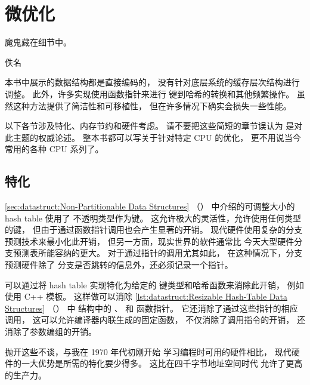 
\section{微优化}
\label{sec:together:Micro-Optimization}
%
\epigraph{魔鬼藏在细节中。}{佚名}

本书中展示的数据结构都是直接编码的，
没有针对底层系统的缓存层次结构进行调整。
此外，许多实现使用函数指针来进行
键到哈希的转换和其他频繁操作。
虽然这种方法提供了简洁性和可移植性，
但在许多情况下确实会损失一些性能。

以下各节涉及特化、内存节约和硬件考虑。
请不要把这些简短的章节误认为
是对此主题的权威论述。
整本书都可以写关于针对特定 CPU 的优化，
更不用说当今常用的各种 CPU 系列了。

\subsection{特化}
\label{sec:together:Specialization}

\cref{sec:datastruct:Non-Partitionable Data Structures}
（）
中介绍的可调整大小的 hash table 使用了
不透明类型作为键。
这允许极大的灵活性，允许使用任何类型的键，
但由于通过函数指针调用也会产生显著的开销。
现代硬件使用复杂的分支预测技术来最小化此开销，
但另一方面，现实世界的软件通常比
今天大型硬件分支预测表所能容纳的更大。
对于通过指针的调用尤其如此，
在这种情况下，分支预测硬件除了
分支是否跳转的信息外，还必须记录一个指针。

可以通过将 hash table 实现特化为给定的
键类型和哈希函数来消除此开销，
例如使用 C++ 模板。
这样做可以消除
\cref{lst:datastruct:Resizable Hash-Table Data Structures}
（）
中  结构中的 、 和
 函数指针。
它还消除了通过这些指针的相应调用，
这可以允许编译器内联生成的固定函数，
不仅消除了调用指令的开销，
还消除了参数编组的开销。

\QuickQuizEnd

抛开这些不谈，与我在 1970 年代初刚开始
学习编程时可用的硬件相比，
现代硬件的一大优势是所需的特化要少得多。
这比在四千字节地址空间时代
允许了更高的生产力。

